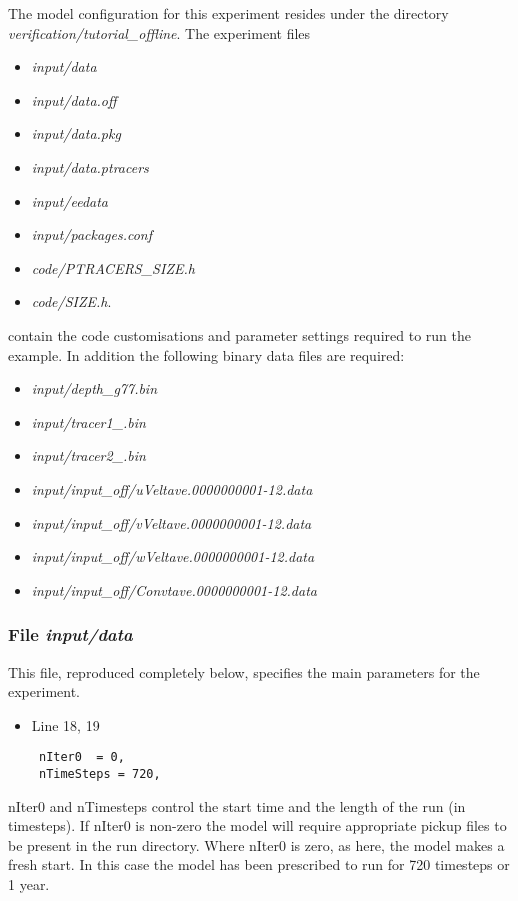 \noindent The model configuration for this experiment resides under the 
directory {\it verification/tutorial\_offline}.  The experiment files 
\begin {itemize}
\item {\it input/data}
\item {\it input/data.off}
\item {\it input/data.pkg}
\item {\it input/data.ptracers}
\item {\it input/eedata}
\item {\it input/packages.conf}
\item {\it code/PTRACERS\_SIZE.h}
\item {\it code/SIZE.h}. 
\end {itemize}

\noindent contain the code customisations and parameter settings
required to run the example. In addition the following binary data
files are required:

\begin {itemize}
\item {\it input/depth\_g77.bin}
\item {\it input/tracer1\_.bin}
\item {\it input/tracer2\_.bin}
\item {\it input/input\_off/uVeltave.0000000001-12.data}
\item {\it input/input\_off/vVeltave.0000000001-12.data}
\item {\it input/input\_off/wVeltave.0000000001-12.data}
\item {\it input/input\_off/Convtave.0000000001-12.data}
\end {itemize}


\subsubsection{File {\it input/data}}
\label{www:tutorials}

\noindent This file, reproduced completely below, specifies the main
parameters for the experiment.

\begin{itemize}
\item Line 18, 19
\begin {verbatim}
 nIter0  = 0,
 nTimeSteps = 720,
\end{verbatim}
\end{itemize}

\noindent nIter0 and nTimesteps control the start time and the length
of the run (in timesteps). If nIter0 is non-zero the model will
require appropriate pickup files to be present in the run directory.
Where nIter0 is zero, as here, the model makes a fresh start. In this
case the model has been prescribed to run for 720 timesteps or 1 year.

